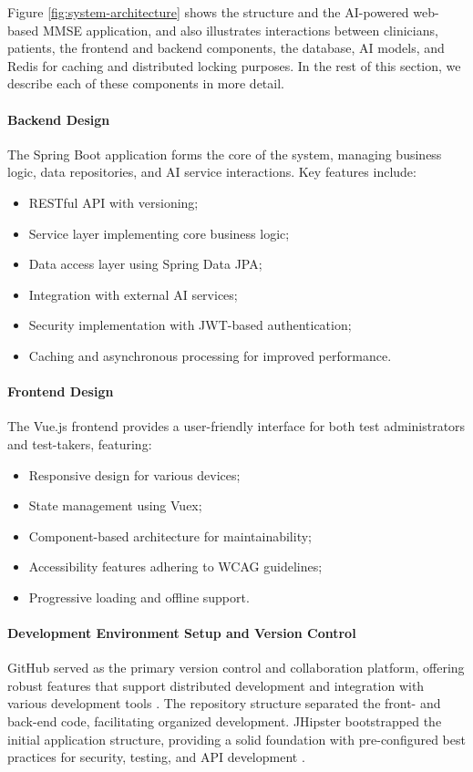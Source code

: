 Figure \ref{fig:system-architecture} shows the structure and the AI-powered web-based MMSE application, and also illustrates interactions between clinicians, patients, the frontend and backend components, the database, AI models, and Redis for caching and distributed locking purposes. In the rest of this section, we describe each of these components in more detail.

\paragraph{Backend Design}
The Spring Boot application forms the core of the system, managing business logic, data repositories, and AI service interactions. Key features include:
\begin{itemize}
    \item RESTful API with versioning;
    \item Service layer implementing core business logic;
    \item Data access layer using Spring Data JPA;
    \item Integration with external AI services;
    \item Security implementation with JWT-based authentication;
    \item Caching and asynchronous processing for improved performance.
\end{itemize}

\paragraph{Frontend Design}
The Vue.js frontend provides a user-friendly interface for both test administrators and test-takers, featuring:
\begin{itemize}
    \item Responsive design for various devices;
    \item State management using Vuex;
    \item Component-based architecture for maintainability;
    \item Accessibility features adhering to WCAG guidelines;
    \item Progressive loading and offline support.
\end{itemize}

\paragraph{Development Environment Setup and Version Control}
GitHub served as the primary version control and collaboration platform, offering robust features that support distributed development and integration with various development tools \cite{github}. The repository structure separated the front- and back-end code, facilitating organized development. JHipster bootstrapped the initial application structure, providing a solid foundation with pre-configured best practices for security, testing, and API development \cite{jhipster}.

